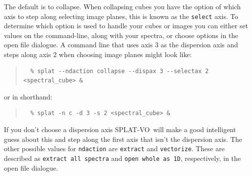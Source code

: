 \documentclass[twoside,11pt]{article}
\newcommand{\htmladdnormallinkfoot}[2]{#1\footnote{#2}}
\renewcommand{\_}{\texttt{\symbol{95}}}
\newcommand{\SPLAT}{\textsf{SPLAT-VO}}
\newcommand{\hitext}[1]{\texttt{#1}}
\newcommand{\ie}{\textit{i.e.}}
\begin{document}
The default is to collapse. When collapsing cubes you have the option of which
axis to step along selecting image planes, this is known as the
\hitext{select} axis. To determine which option is used to handle your cubes or
images you can either set values on the command-line, along with your spectra,
or choose options in the open file dialogue. A command line that uses axis 3 as
the dispersion axis and steps along axis 2 when choosing image planes might
look like:
\begin{quote}
\begin{verbatim}
  % splat --ndaction collapse --dispax 3 --selectax 2 <spectral_cube> &
\end{verbatim}
\end{quote}
or in shorthand:
\begin{quote}
\begin{verbatim}
  % splat -n c -d 3 -s 2 <spectral_cube> &
\end{verbatim}
\end{quote}
If you don't choose a dispersion axis \SPLAT\ will make a good intelligent
guess about this and step along the first axis that isn't the dispersion axis.
The other possible values for \hitext{ndaction} are \hitext{extract} and
\hitext{vectorize}. These are described as \hitext{extract all spectra} 
and \hitext{open whole as 1D}, respectively, in the open file dialogue.

%



\end{document}
